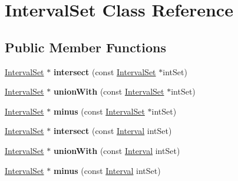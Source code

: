 \hypertarget{classIntervalSet}{\section{Interval\-Set Class Reference}
\label{classIntervalSet}
}
\subsection*{Public Member Functions}
\begin{DoxyCompactItemize}
\item 
\hypertarget{classIntervalSet_a7f61649f6b0fdbef85e53883d35c312c}{\hyperlink{classIntervalSet}{Interval\-Set} $\ast$ {\bfseries intersect} (const \hyperlink{classIntervalSet}{Interval\-Set} $\ast$int\-Set)}\label{classIntervalSet_a7f61649f6b0fdbef85e53883d35c312c}

\item 
\hypertarget{classIntervalSet_afea4e5deb06c11f6e30fe367616a3def}{\hyperlink{classIntervalSet}{Interval\-Set} $\ast$ {\bfseries union\-With} (const \hyperlink{classIntervalSet}{Interval\-Set} $\ast$int\-Set)}\label{classIntervalSet_afea4e5deb06c11f6e30fe367616a3def}

\item 
\hypertarget{classIntervalSet_ac58c7985b4cc4f046e46195745bef87f}{\hyperlink{classIntervalSet}{Interval\-Set} $\ast$ {\bfseries minus} (const \hyperlink{classIntervalSet}{Interval\-Set} $\ast$int\-Set)}\label{classIntervalSet_ac58c7985b4cc4f046e46195745bef87f}

\item 
\hypertarget{classIntervalSet_ae485c7de02370ac6e9d13fb8ab940551}{\hyperlink{classIntervalSet}{Interval\-Set} $\ast$ {\bfseries intersect} (const \hyperlink{classInterval}{Interval} int\-Set)}\label{classIntervalSet_ae485c7de02370ac6e9d13fb8ab940551}

\item 
\hypertarget{classIntervalSet_affeaed45fc91426f5e43ac9400efa098}{\hyperlink{classIntervalSet}{Interval\-Set} $\ast$ {\bfseries union\-With} (const \hyperlink{classInterval}{Interval} int\-Set)}\label{classIntervalSet_affeaed45fc91426f5e43ac9400efa098}

\item 
\hypertarget{classIntervalSet_a33617c4739861b6a2d3fd8bbc7424b7d}{\hyperlink{classIntervalSet}{Interval\-Set} $\ast$ {\bfseries minus} (const \hyperlink{classInterval}{Interval} int\-Set)}\label{classIntervalSet_a33617c4739861b6a2d3fd8bbc7424b7d}


\end{DoxyCompactItemize}
